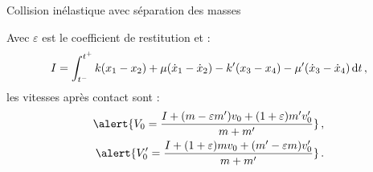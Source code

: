 \begin{frame}{Collision inélastique avec séparation des masses}
{{            \pause
            Avec $\varepsilon$ est le coefficient de restitution et :
            \scriptsize
            $$
            I = \int_{t^{-}}^{t^{+}} k(x_1 - x_2) + \mu (\dot x_1 - \dot x_2) - k'(x_3 - x_4) - \mu'(\dot x_3 - \dot x_4) \mathop{}\!\mathrm{d} t \,,
            $$
            \normalsize
            les vitesses après contact sont :
            \begin{align*}
                \alert{V_0 = \frac{I + (m-\varepsilon m')v_0 + (1+\varepsilon)m'v'_0}{m+m'}}\,, \\
                \alert{V'_0 = \frac{I + (1+\varepsilon)mv_0 + (m'-\varepsilon m)v'_0}{m+m'}}\,.
            \end{align*}
            

        }

    }
    
\end{frame}




